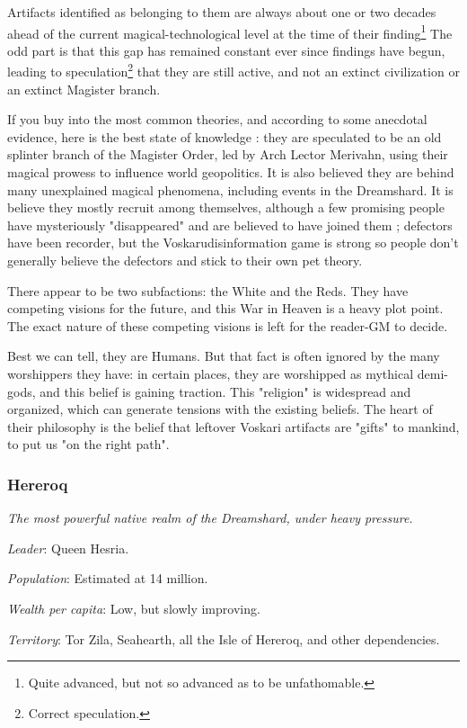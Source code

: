 Artifacts identified as belonging to them are always about one or two decades ahead of the current magical-technological level at the time of their finding\footnote{Quite advanced, but not so advanced as to be unfathomable.} The odd part is that this gap has remained constant ever since findings have begun, leading to speculation\footnote{Correct speculation.} that they are still active, and not an extinct civilization or an extinct Magister branch.

If you buy into the most common theories, and according to some anecdotal evidence, here is the best state of knowledge : they are speculated to be an old splinter branch of the Magister Order, led by Arch Lector Merivahn, using their magical prowess to influence world geopolitics. It is also believed they are behind many unexplained magical phenomena, including events in the Dreamshard. It is believe they mostly recruit among themselves, although a few promising people have mysteriously "disappeared" and are believed to have joined them ; defectors have been recorder, but the Voskarudisinformation game is strong so people don't generally believe the defectors and stick to their own pet theory.

There appear to be two subfactions: the White and the Reds. They have competing visions for the future, and this War in Heaven is a heavy plot point. The exact nature of these competing visions is left for the reader-GM to decide.


Best we can tell, they are Humans. But that fact is often ignored by the many worshippers they have: in certain places, they are worshipped as mythical demi-gods, and this belief is gaining traction. This "religion" is widespread and organized, which can generate tensions with the existing beliefs. The heart of their philosophy is the belief that leftover Voskari artifacts are "gifts" to mankind, to put us "on the right path".


\subsubsection{Hereroq}

\textit{The most powerful native realm of the Dreamshard, under heavy pressure.}

\textit{Leader}: Queen Hesria.

\textit{Population}: Estimated at 14 million.

\textit{Wealth per capita}: Low, but slowly improving.

\textit{Territory}: Tor Zila, Seahearth, all the Isle of Hereroq, and other dependencies.
    
